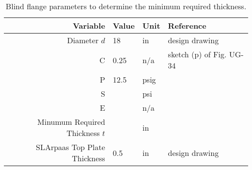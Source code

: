 \begin{table}[h]
\begin{center}
\tabcolsep=10pt
\begin{tabular}{r|l|l|l}
\hline
\hline
Variable & Value & Unit & Reference \\
\hline
Diameter $d$ & 18 & in & design drawing \\
C & 0.25 & n/a & sketch (p) of Fig. UG-34 \\
P & 12.5 & psig & \\
S & & psi & \\
E & & n/a & \\
\hline
Minumum Required Thickness $t$ & & in & \\
\hline
SLArpaas Top Plate Thickness & 0.5 & in & design drawing \\
\hline
\hline
\end{tabular}
\caption{Blind flange parameters to determine the minimum required thickness.}
\label{table:blind_flange}
\end{center}
\end{table}

